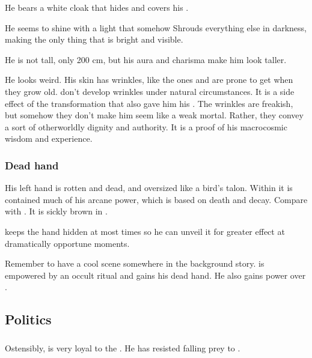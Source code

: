 He bears a white cloak that hides and covers his . 

He seems to shine with a light that somehow Shrouds everything else in darkness, making \Azraid{} the only thing that is bright and visible. 

He is not tall, only 200 cm, but his aura and charisma make him look taller. 

He looks weird. 
His skin has wrinkles, like the ones \nephilim{} and \humans{} are prone to get when they grow old. 
\Resphain{} don't develop wrinkles under natural circumstances. 
It is a side effect of the transformation that also gave him his . 
The wrinkles are freakish, but somehow they don't make him seem like a weak mortal. 
Rather, they convey a sort of otherworldly dignity and authority. 
It is a proof of his macrocosmic wisdom and experience. 





\subsubsection{Dead hand}
His left hand is rotten and dead, and oversized like a bird's talon. 
Within it is contained much of his arcane power, which is based on death and decay. 
Compare with .
It is sickly brown in \colour. 

\Azraid keeps the hand hidden at most times so he can unveil it for greater effect at dramatically opportune moments. 

Remember to have a cool scene somewhere in the background story. 
\Azraid{} is empowered by an occult ritual and gains his dead hand. 
He also gains power over . 









\subsection{Politics}





\subsubsection{\Banes}
Ostensibly, \Azraid{} is very loyal to the \banes. 
He has resisted falling prey to . 

